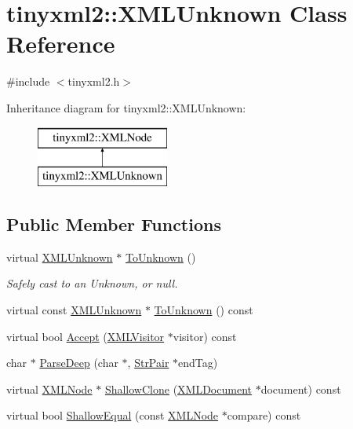 \hypertarget{classtinyxml2_1_1_x_m_l_unknown}{}\section{tinyxml2\+:\+:X\+M\+L\+Unknown Class Reference}
\label{classtinyxml2_1_1_x_m_l_unknown}


{\ttfamily \#include $<$tinyxml2.\+h$>$}

Inheritance diagram for tinyxml2\+:\+:X\+M\+L\+Unknown\+:\begin{figure}[H]
\begin{center}
\leavevmode
\includegraphics[height=2.000000cm]{classtinyxml2_1_1_x_m_l_unknown}
\end{center}
\end{figure}
\subsection*{Public Member Functions}
\begin{DoxyCompactItemize}
\item 
virtual \hyperlink{classtinyxml2_1_1_x_m_l_unknown}{X\+M\+L\+Unknown} $\ast$ \hyperlink{classtinyxml2_1_1_x_m_l_unknown_af4374856421921cad578c8affae872b6}{To\+Unknown} ()
\begin{DoxyCompactList}\small\item\em Safely cast to an Unknown, or null. \end{DoxyCompactList}\item 
virtual const \hyperlink{classtinyxml2_1_1_x_m_l_unknown}{X\+M\+L\+Unknown} $\ast$ \hyperlink{classtinyxml2_1_1_x_m_l_unknown_a257987e79955399e6e9f119b58d4bb30}{To\+Unknown} () const 
\item 
virtual bool \hyperlink{classtinyxml2_1_1_x_m_l_unknown_a0d341ab804a1438a474810bb5bd29dd5}{Accept} (\hyperlink{classtinyxml2_1_1_x_m_l_visitor}{X\+M\+L\+Visitor} $\ast$visitor) const 
\item 
char $\ast$ \hyperlink{classtinyxml2_1_1_x_m_l_unknown_a0e4f3509dee42a4d45a7f0002be568cc}{Parse\+Deep} (char $\ast$, \hyperlink{classtinyxml2_1_1_str_pair}{Str\+Pair} $\ast$end\+Tag)
\item 
virtual \hyperlink{classtinyxml2_1_1_x_m_l_node}{X\+M\+L\+Node} $\ast$ \hyperlink{classtinyxml2_1_1_x_m_l_unknown_aa09fc7cb0cd64d6bb9c5ae00ffc549ec}{Shallow\+Clone} (\hyperlink{classtinyxml2_1_1_x_m_l_document}{X\+M\+L\+Document} $\ast$document) const 
\item 
virtual bool \hyperlink{classtinyxml2_1_1_x_m_l_unknown_a0169df157bf69a092b404ca49621ff1a}{Shallow\+Equal} (const \hyperlink{classtinyxml2_1_1_x_m_l_node}{X\+M\+L\+Node} $\ast$compare) const 
\end{DoxyCompactItemize}
